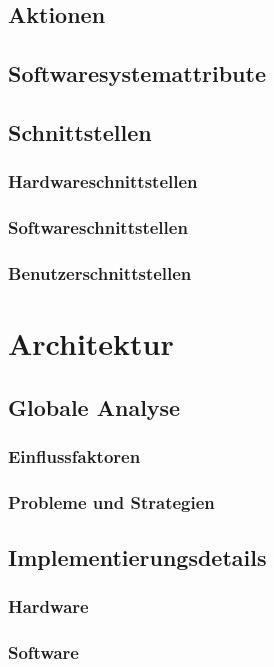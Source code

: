 \documentclass{Ausarbeitung}
\begin{document}
	\subsection{Aktionen}
	\label{aktionen}
	\subsection{Softwaresystemattribute}
	\label{attribute}
	\subsection{Schnittstellen}
	\label{interfaces}
			\subsubsection{Hardwareschnittstellen}
			\label{hardwareI}
			\subsubsection{Softwareschnittstellen}
			\label{SoftwareI}
			\subsubsection{Benutzerschnittstellen}
			\label{userI}
\clearpage
\section{Architektur}
\label{architektur}
	\subsection{Globale Analyse}
	\label{globAnalyse}
		\subsubsection{Einflussfaktoren}
		\label{einfluss}
		\subsubsection{Probleme und Strategien}
		\label{probleme}
	\subsection{Implementierungsdetails}
	\label{details}
		\subsubsection{Hardware}
		\label{hardware}
		\subsubsection{Software}
		\label{software}
\clearpage
\end{document}
